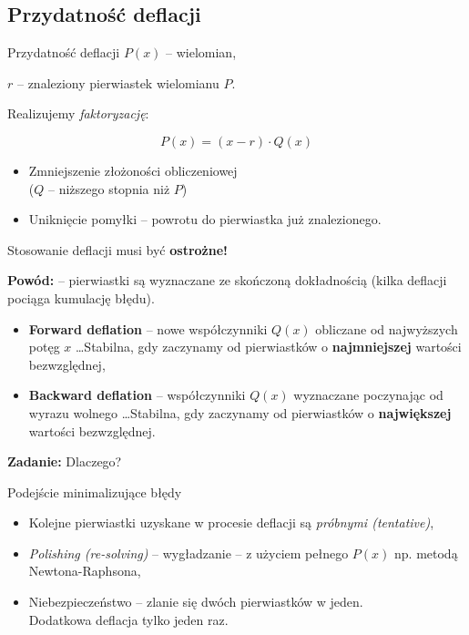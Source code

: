 \subsection{Przydatność deflacji}

\begin{frame}{Przydatność deflacji}
  $P(x)$ -- wielomian,

  $r$ -- znaleziony pierwiastek wielomianu $P$.

  Realizujemy \textit{faktoryzację}:
  \begin{block}{}
    $$ P(x) = (x - r) \cdot Q(x) $$
  \end{block}

  \begin{itemize}
    \item Zmniejszenie złożoności obliczeniowej\\
     ($Q$ -- niższego stopnia niż $P$)
    \item Uniknięcie pomyłki -- powrotu do pierwiastka już znalezionego.
  \end{itemize}
\end{frame}

\begin{frame}
  Stosowanie deflacji musi być \textbf{ostrożne!}

  \textbf{Powód:} -- pierwiastki są wyznaczane ze skończoną dokładnością (kilka deflacji pociąga kumulację błędu).

  \begin{block}{}
    \begin{itemize}
      \item \textbf{Forward deflation} -- nowe współczynniki $Q(x)$ obliczane od najwyższych potęg $x$ \dots Stabilna, gdy zaczynamy od pierwiastków o \textbf{najmniejszej} wartości bezwzględnej,
      \item \textbf{Backward deflation} -- współczynniki $Q(x)$ wyznaczane poczynając od wyrazu wolnego \dots Stabilna, gdy zaczynamy od pierwiastków o \textbf{największej} wartości bezwzględnej.
    \end{itemize}
  \end{block}

  \textbf{Zadanie:} Dlaczego?
\end{frame}

\begin{frame}
  \begin{block}{Podejście minimalizujące błędy}
    \begin{itemize}
      \item Kolejne pierwiastki uzyskane w procesie deflacji są \textit{próbnymi (tentative)},
      \item \textit{Polishing (re-solving)} -- wygładzanie -- z użyciem pełnego $P(x)$ np. metodą Newtona-Raphsona,
      \item Niebezpieczeństwo -- zlanie się dwóch pierwiastków w jeden.\\
        Dodatkowa deflacja tylko jeden raz.
    \end{itemize}
  \end{block}
\end{frame}

